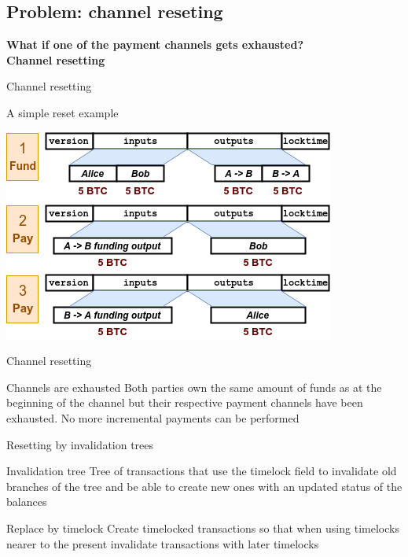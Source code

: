 \documentclass{beamer}
\begin{document}
\subsection{Problem: channel reseting}
\begin{frame}
 \begin{center}
  \textbf{What if one of the payment channels gets exhausted?}\\
  \pause
  \huge\textbf{Channel resetting}
 \end{center}
\end{frame}
\begin{frame}{Channel resetting}
 \begin{exampleblock}{A simple reset example}
  \begin{center}
   \includegraphics[width=\textwidth, height=0.8\textheight, keepaspectratio]{img/bidir_reset.png}
  \end{center}
 \end{exampleblock}
\end{frame}
\begin{frame}{Channel resetting}
 \begin{alertblock}{Channels are exhausted}
  Both parties own the same amount of funds as at the beginning of the channel but their respective payment channels have been exhausted. No more incremental payments can be performed
 \end{alertblock}
\end{frame}
\begin{frame}{Resetting by invalidation trees}
 \begin{block}{Invalidation tree}
  Tree of transactions that use the timelock field to invalidate old branches of the tree and be able to create new ones with an updated status of the balances
 \end{block}
 \pause
 \begin{block}{Replace by timelock}
  Create timelocked transactions so that when using timelocks nearer to the present invalidate transactions with later timelocks
 \end{block}
\end{frame}
\end{document}
